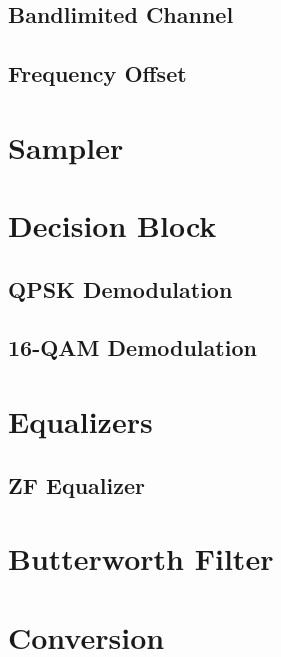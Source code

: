 \documentclass[]{article}
\begin{document}
\subsection{Bandlimited Channel}
\label{app:bandlimited}


\subsection{Frequency Offset}
\label{app:freq}


\section{Sampler}
\label{app:sampler}


\section{Decision Block}
\label{app:dblocks}
\subsection{QPSK Demodulation}
\label{app:qpsk_demod}


\subsection{16-QAM Demodulation}
\label{app:16qam_demod}


\section{Equalizers}
\subsection{ZF Equalizer}
\label{app:zf}



\section{Butterworth Filter}
\label{app:butterworth}


\section{Conversion}
\label{app:convert}
\end{document}
